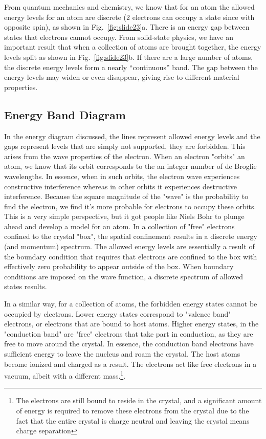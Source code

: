 From quantum mechanics and chemistry,  we know that for an atom the allowed energy levels for an atom are discrete (2 electrons can occupy a state since with opposite spin), as shown in Fig.~\ref{fig:slide23}a.  There is an energy gap between states that electrons cannot occupy.   From solid-state physics, we have an important result that when a collection of atoms are brought together, the energy levels split as shown in Fig.~\ref{fig:slide23}b.   If there are a large number of atoms, the discrete energy levels form a nearly “continuous” band.   The gap between the energy levels may widen or even disappear, giving rise to different material properties.
 

\subsection{Energy Band Diagram}

In the energy diagram discussed, the lines represent allowed energy levels and the gaps represent levels that are simply not supported, they are forbidden.  This arises from the wave properties of the electron.  When an electron "orbits" an atom, we know that its orbit corresponds to the an integer number of de Broglie wavelengths.  In essence, when in such orbits, the electron wave experiences constructive interference whereas in other orbits it experiences destructive interference.  Because the square magnitude of the "wave" is the probability to find the electron, we find it's more probable for electrons to occupy these orbits.  This is a very simple perspective, but it got people like Niels Bohr to plunge ahead and develop a model for an atom.   In a collection of "free" electrons confined to the crystal "box", the spatial confinement results in a discrete energy (and momentum) spectrum.  The allowed energy levels are essentially a result of the boundary condition that requires that electrons are confined to the box with effectively zero probability to appear outside of the box.  When boundary conditions are imposed on the wave function, a discrete spectrum of allowed states results.  

In a similar way, for a collection of atoms, the forbidden energy states cannot be occupied by electrons.    Lower energy states correspond to "valence band" electrons, or electrons that are bound to host atoms.  Higher energy states, in the "conduction band" are "free" electrons that take part in conduction, as they are free to move around the crystal.  In essence, the conduction band electrons have sufficient energy to leave the nucleus and roam the crystal.  The host atoms become ionized and charged as a result.   The electrons act like free electrons in a vacuum, albeit with a different mass.\footnote{The electrons are still bound to reside in the crystal, and a significant amount of energy is required to remove these electrons from the crystal due to the fact that the entire crystal is charge neutral and leaving the crystal means charge separation}.  

